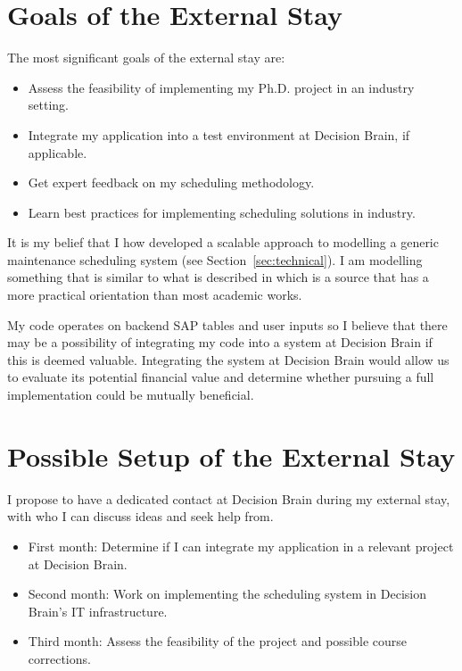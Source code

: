 \section*{Goals of the External Stay}
The most significant goals of the external stay are:

\begin{itemize}
	\item Assess the feasibility of implementing my Ph.D. project in an industry setting.
	\item Integrate my application into a test environment at Decision Brain, if applicable.
	\item Get expert feedback on my scheduling methodology. 
	\item Learn best practices for implementing scheduling solutions in industry.
\end{itemize}

It is my belief that I how developed a scalable approach to modelling a generic 
maintenance scheduling system (see Section~\ref{sec:technical}). I am 
modelling something that is similar to what is described in \citet{palmerMaintenancePlanningScheduling2019} 
which is a source that has a more practical orientation than most academic works. 

My code operates on backend SAP tables and user inputs so I believe that there may be a possibility of integrating my 
code into a system at Decision Brain if this is deemed valuable. Integrating the system at Decision 
Brain would allow us to evaluate its potential financial value and determine whether pursuing a
full implementation could be mutually beneficial.

\newpage
\section*{Possible Setup of the External Stay}
I propose to have a dedicated contact at Decision Brain during my external stay, with who I can discuss ideas and seek help from.

\begin{itemize}
	\item First month: Determine if I can integrate my application in a relevant project at Decision Brain.
	\item Second month: Work on implementing the scheduling system in Decision Brain's IT infrastructure.
	\item Third month: Assess the feasibility of the project and possible course corrections.
\end{itemize}

